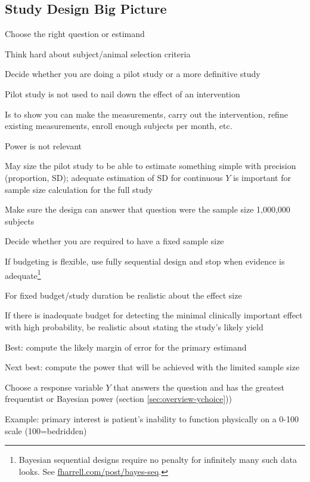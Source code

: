 \subsection{Study Design Big Picture}\label{sec:htest-design-big}
\bi
\item Choose the right question or estimand
\item Think hard about subject/animal selection criteria
\item Decide whether you are doing a pilot study or a more definitive study
  \bi
  \item Pilot study is not used to nail down the effect of an intervention
  \item Is to show you can make the measurements, carry out the intervention, refine existing measurements, enroll enough subjects per month, etc.
  \item Power is not relevant
  \item May size the pilot study to be able to estimate something simple with precision (proportion, SD); adequate estimation of SD for continuous $Y$ is important for sample size calculation for the full study
  \ei
\item Make sure the design can answer that question were the sample size 1,000,000 subjects
\item Decide whether you are required to have a fixed sample size
 \bi 
 \item If budgeting is flexible, use fully sequential design and stop when evidence is adequate\footnote{Bayesian sequential designs require no penalty for infinitely many such data looks.  See \href{https://www.fharrell.com/post/bayes-seq}{fharrell.com/post/bayes-seq}.}
 \item For fixed budget/study duration be realistic about the effect size
 \ei 
\item If there is inadequate budget for detecting the minimal clinically important effect with high probability, be realistic about stating the study's likely yield
 \bi
 \item Best: compute the likely margin of error for the primary estimand
 \item Next best: compute the power that will be achieved with the limited sample size
 \ei
\item Choose a response variable $Y$ that answers the question and has the greatest frequentist or Bayesian power (section \ref{sec:overview-ychoice}))
  \bi
  \item Example: primary interest is patient's inability to function physically on a 0-100 scale (100=bedridden)
